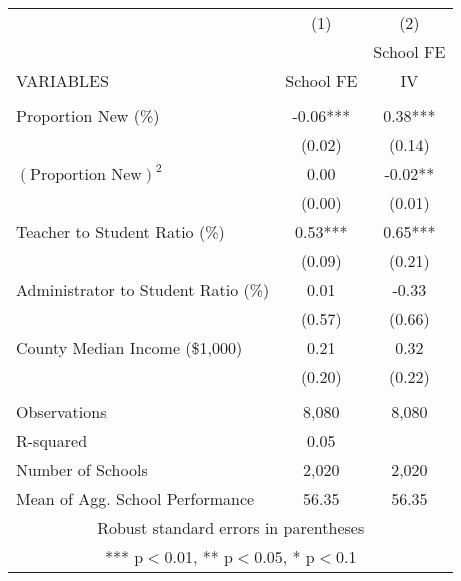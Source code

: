 \begin{tabular}{lcc}
\hline\hline
 & (1) & (2) \\
 &  & School FE \\
VARIABLES & School FE & IV \\ \hline
 &  &  \\
Proportion New (\%) & -0.06*** & 0.38*** \\
 & (0.02) & (0.14) \\
$(\text{Proportion New})^2$ & 0.00 & -0.02** \\
 & (0.00) & (0.01) \\
Teacher to Student Ratio (\%) & 0.53*** & 0.65*** \\
 & (0.09) & (0.21) \\
Administrator to Student Ratio (\%) & 0.01 & -0.33 \\
 & (0.57) & (0.66) \\
County Median Income (\$1,000) & 0.21 & 0.32 \\
 & (0.20) & (0.22) \\
 &  &  \\
Observations & 8,080 & 8,080 \\
R-squared & 0.05 &  \\
 Number of Schools & 2,020 & 2,020 \\
 Mean of Agg. School Performance & 56.35 & 56.35\\\hline\hline
\multicolumn{3}{c}{ Robust standard errors in parentheses} \\
\multicolumn{3}{c}{ *** p$<$0.01, ** p$<$0.05, * p$<$0.1} \\
\end{tabular}
